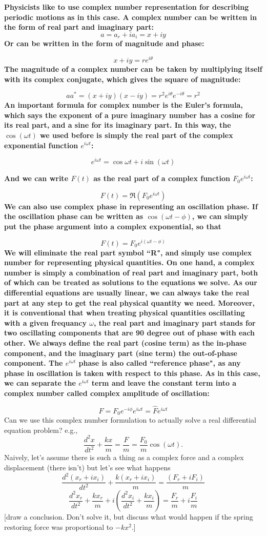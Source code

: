 \documentclass[]{revtex4}
\newcommand{\st}[1]{{\color{red}\bfseries #1}}
\begin{document}
\st{
Physicists like to use complex number representation for describing periodic motions as in this case. A complex number can be written in the form of real part and imaginary part:
}
\[a = a_r + ia_i = x + iy\]
\st{
Or can be written in the form of magnitude and phase:
}

\[x+iy = re^{i\theta}\]
\st{
The magnitude of a complex number can be taken by multiplying itself with its complex conjugate, which gives the square of magnitude:
}

\[aa^*=(x+iy)(x-iy)=r^2e^{i\theta}e^{-i\theta}=r^2\]
\st{
An important formula for complex number is the Euler's formula, which says the exponent of a pure imaginary number has a cosine for its real part, and a sine for its imaginary part. In this way, the $\cos(\omega t)$ we used before is simply the real part of the complex exponential function $e^{i\omega t}$:
}

\[e^{i\omega t}=\cos{\omega t}+i\sin(\omega t)\]
\st{
And we can write $F(t)$ as the real part of a complex function $F_0 e^{i\omega t}$:

}

\[F(t) = \Re(F_0e^{i\omega t})\]
\st{
We can also use complex phase in representing an oscillation phase. If the oscillation phase can be written as $\cos(\omega t - \phi)$, we can simply put the phase argument into a complex exponential, so that
}

\[F(t) = F_0e^{i(\omega t-\phi)}\]
\st{
We will eliminate the real part symbol ``R", and simply use complex number for representing physical quantities. On one hand, a complex number is simply a combination of real part and imaginary part, both of which can be treated as solutions to the equations we solve. As our differential equations are usually linear, we can always take the real part at any step to get the real physical quantity we need. Moreover, it is conventional that when treating physical quantities oscillating with a given frequancy $\omega$, the real part and imaginary part stands for two oscillating components that are 90 degree out of phase with each other. We always define the real part (cosine term) as the in-phase component, and the imaginary part (sine term) the out-of-phase component. The $e^{i\omega t}$ phase is also called ``reference phase", as any phase in oscillation is taken with respect to this phase. As in this case, we can separate the $e^{i\omega t}$ term and leave the constant term into a complex number called complex amplitude of oscillation:
}

\[F = F_0e^{-i\phi}e^{i\omega t}=\widehat{F}e^{i\omega t}\]
Can we use this complex number formulation to actually solve a real differential equation problem? e.g.,
\[\frac{d^2x}{dt^2}+\frac{kx}{m} = \frac{F}{m}=\frac{F_0}{m}\cos(\omega t).\]
Naively, let's assume there is such a thing as a complex force and a complex displacement (there isn't) but let's see what happens
\[\frac{d^2(x_r+ix_i)}{dt^2}+\frac{k(x_r+ix_i)}{m} = \frac{(F_r+iF_i)}{m}\]
\[\frac{d^2x_r}{dt^2}+\frac{kx_r}{m}+i\left(\frac{d^2x_i}{dt^2}+\frac{kx_i}{m}\right)= \frac{F_r}{m}+i\frac{F_i}{m}\]
[draw a conclusion.  Don't solve it, but discuss what would happen if the spring restoring force was proportional to $-kx^2$.]
\end{document}
